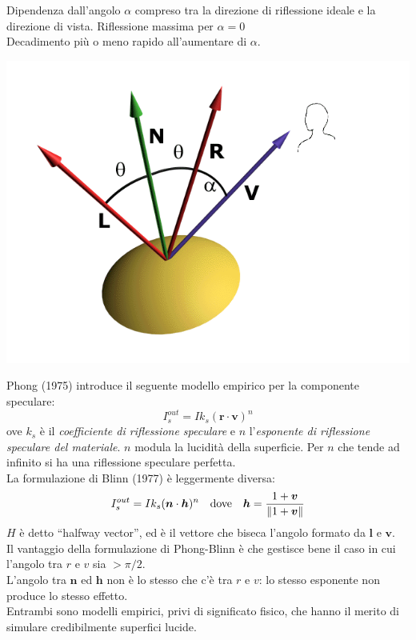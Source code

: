\documentclass[a4paper, 10pt]{article}
\renewcommand{\vec}{\bm}
\begin{document}
			\begin{multicols}{2}
				
				Dipendenza dall’angolo $ \alpha $ compreso tra la direzione di
				riflessione ideale e la direzione di vista.
				Riflessione massima per $ \alpha = 0 $\\
				Decadimento più o meno rapido all’aumentare di $ \alpha $.\\
				
				\columnbreak
				
				\vspace*{-0.8cm}
				\includegraphics[scale=0.3]{speculare}
				
			\end{multicols}
			Phong (1975) introduce il seguente modello empirico per la
			componente speculare:
			\[
				I_s^{out} = Ik_s (\vec{r}\cdot\vec{v})^n
			\]
			ove $ k_s $ è il \textit{coefficiente di riflessione speculare}
			e $ n $ l’\textit{esponente di riflessione speculare del materiale}.
			$ n $ modula la lucidità della superficie. Per $ n $ che tende ad infinito si ha una
			riflessione speculare perfetta.\\
			La formulazione di Blinn (1977) è leggermente diversa:
			\[
				I_s^{out} = Ik_s(\vec{n}\cdot\vec{h})^n \quad \textup{dove} \quad 
				\vec{h} = \dfrac{1 + \vec{v}}{\| 1+\vec{v} \|}
			\]
			$ H $ è detto “halfway vector”, ed è il vettore che biseca
			l’angolo formato da $ \vec{l} $ e $ \vec{v} $.\\
			Il vantaggio della formulazione di Phong-Blinn è che gestisce
			bene il caso in cui l’angolo tra $ r $ e $ v $ sia $ > \pi/2 $.\\
			L’angolo tra $ \vec{n} $ ed $ \vec{h} $ non è lo stesso che c’è tra $ r $ e $ v $: lo
			stesso esponente non produce lo stesso effetto.\\
			Entrambi sono modelli empirici, privi di significato fisico, che
			hanno il merito di simulare credibilmente superfici lucide.
			
\end{document}
